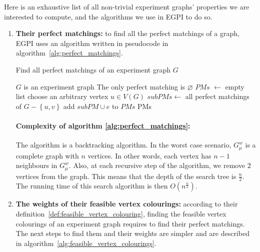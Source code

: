 Here is an exhaustive list of all non-trivial experiment graphs' properties we are interested to compute, and the algorithms we use in EGPI to do so.

\begin{enumerate}
    \item \textbf{Their perfect matchings:} to find all the perfect matchings of a graph, EGPI uses an algorithm written in pseudocode in algorithm~\ref{alg:perfect_matchings}.

        \begin{algorithm}
            \caption{Find all perfect matchings of an experiment graph $G$}
            \label{alg:perfect_matchings}
            \begin{algorithmic}
                \Require $G$ is an experiment graph
                    \State The only perfect matching is $\varnothing$
                    \State $PMs$ $\gets$ empty list
                    \State choose an arbitrary vertex $u \in V(G)$
                        \State $subPMs \gets$ all perfect matchings of $G - \left\{ u, v \right\}$
                                \State add $subPM \cup e$ to $PMs$
                            \EndFor
                        \EndFor
                    \EndFor
                \EndIf
                \State \Return PMs
            \end{algorithmic}
        \end{algorithm}

        \paragraph{Complexity of algorithm \ref {alg:perfect_matchings}:}
        The algorithm is a backtracking algorithm.
        In the worst case scenario, $G_\mu^w$ is a complete graph with $n$ vertices.
        In other words, each vertex has $n-1$ neighbours in $G_\mu^w$.
        Also, at each recursive step of the algorithm, we remove $2$ vertices from the graph.
        This means that the depth of the search tree is $\frac{n}{2}$.
        The running time of this search algorithm is then $O\left(n^\frac{n}{2}\right)$. \\

    \item \textbf{The weights of their feasible vertex colourings:} according to their definition~\ref{def:feasible_vertex_colouring}, finding the feasible vertex colourings of an experiment graph requires to find their perfect matchings.
        The next steps to find them and their weights are simpler and are described in algorithm~\ref{alg:feasible_vertex_colourings}.


\end{enumerate}
